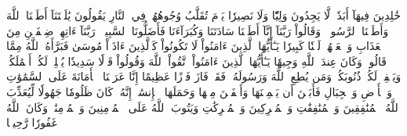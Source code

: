 خَٰلِدِينَ فِيهَآ أَبَدٗاۖ لَّا يَجِدُونَ وَلِيّٗا وَلَا نَصِيرٗا
يَوۡمَ تُقَلَّبُ وُجُوهُهُمۡ فِي ٱلنَّارِ يَقُولُونَ يَٰلَيۡتَنَآ أَطَعۡنَا ٱللَّهَ وَأَطَعۡنَا ٱلرَّسُولَا۠
وَقَالُواْ رَبَّنَآ إِنَّآ أَطَعۡنَا سَادَتَنَا وَكُبَرَآءَنَا فَأَضَلُّونَا ٱلسَّبِيلَا۠
رَبَّنَآ ءَاتِهِمۡ ضِعۡفَيۡنِ مِنَ ٱلۡعَذَابِ وَٱلۡعَنۡهُمۡ لَعۡنٗا كَبِيرٗا
يَـٰٓأَيُّهَا ٱلَّذِينَ ءَامَنُواْ لَا تَكُونُواْ كَٱلَّذِينَ ءَاذَوۡاْ مُوسَىٰ فَبَرَّأَهُ ٱللَّهُ مِمَّا قَالُواْۚ وَكَانَ عِندَ ٱللَّهِ وَجِيهٗا
يَـٰٓأَيُّهَا ٱلَّذِينَ ءَامَنُواْ ٱتَّقُواْ ٱللَّهَ وَقُولُواْ قَوۡلٗا سَدِيدٗا
يُصۡلِحۡ لَكُمۡ أَعۡمَٰلَكُمۡ وَيَغۡفِرۡ لَكُمۡ ذُنُوبَكُمۡۗ وَمَن يُطِعِ ٱللَّهَ وَرَسُولَهُۥ فَقَدۡ فَازَ فَوۡزًا عَظِيمًا
إِنَّا عَرَضۡنَا ٱلۡأَمَانَةَ عَلَى ٱلسَّمَٰوَٰتِ وَٱلۡأَرۡضِ وَٱلۡجِبَالِ فَأَبَيۡنَ أَن يَحۡمِلۡنَهَا وَأَشۡفَقۡنَ مِنۡهَا وَحَمَلَهَا ٱلۡإِنسَٰنُۖ إِنَّهُۥ كَانَ ظَلُومٗا جَهُولٗا
لِّيُعَذِّبَ ٱللَّهُ ٱلۡمُنَٰفِقِينَ وَٱلۡمُنَٰفِقَٰتِ وَٱلۡمُشۡرِكِينَ وَٱلۡمُشۡرِكَٰتِ وَيَتُوبَ ٱللَّهُ عَلَى ٱلۡمُؤۡمِنِينَ وَٱلۡمُؤۡمِنَٰتِۗ وَكَانَ ٱللَّهُ غَفُورٗا رَّحِيمَۢا